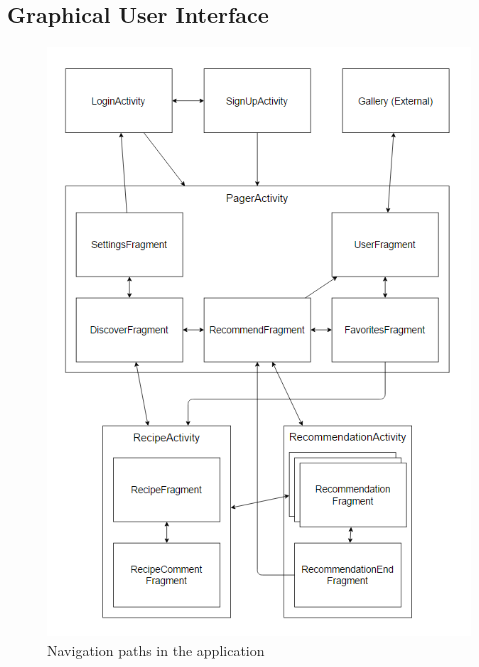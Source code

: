 \subsection{Graphical User Interface}
\label{subsec:gui}

\begin{figure}[H]
	\centering
	\includegraphics[width=\textwidth]{Pictures/application_navigation.png}
	\caption{Navigation paths in the application}
	\label{fig:lifecycle}
\end{figure}